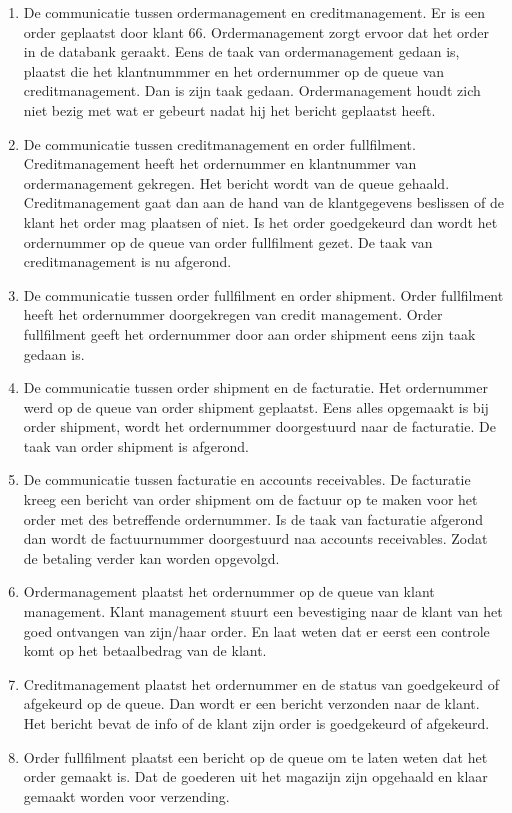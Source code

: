 \begin{enumerate}
	\item De communicatie tussen ordermanagement en creditmanagement. Er is een order geplaatst door klant 66. Ordermanagement zorgt ervoor dat het order in de databank geraakt. Eens de taak van ordermanagement gedaan is, plaatst die het klantnummmer en het ordernummer op de queue van creditmanagement. Dan is zijn taak gedaan. Ordermanagement houdt zich niet bezig met wat er gebeurt nadat hij het bericht geplaatst heeft.
	\item De communicatie tussen creditmanagement en order fullfilment. Creditmanagement heeft het ordernummer en klantnummer van ordermanagement gekregen. Het bericht wordt van de queue gehaald. Creditmanagement gaat dan aan de hand van de klantgegevens beslissen of de klant het order mag plaatsen of niet. Is het order goedgekeurd dan wordt het ordernummer op de queue van order fullfilment gezet. De taak van creditmanagement is nu afgerond.
	\item De communicatie tussen order fullfilment en order shipment. Order fullfilment heeft het ordernummer doorgekregen van credit management. Order fullfilment geeft het ordernummer door aan order shipment eens zijn taak gedaan is. 
	\item De communicatie tussen order shipment en de facturatie. Het ordernummer werd op de queue van order shipment geplaatst. Eens alles opgemaakt is bij order shipment, wordt het ordernummer doorgestuurd naar de facturatie. De taak van order shipment is afgerond.
	\item De communicatie tussen facturatie en accounts receivables. De facturatie kreeg een bericht van order shipment om de factuur op te maken voor het order met des betreffende ordernummer. Is de taak van facturatie afgerond dan wordt de factuurnummer doorgestuurd naa accounts receivables. Zodat de betaling verder kan worden opgevolgd.
	\item Ordermanagement plaatst het ordernummer op de queue van klant management. Klant management stuurt een bevestiging naar de klant van het goed ontvangen van zijn/haar order. En laat weten dat er eerst een controle komt op het betaalbedrag van de klant.
	\item Creditmanagement plaatst het ordernummer en de status van goedgekeurd of afgekeurd op de queue. Dan wordt er een bericht verzonden naar de klant. Het bericht bevat de info of de klant zijn order is goedgekeurd of afgekeurd.
	\item Order fullfilment plaatst een bericht op de queue om te laten weten dat het order gemaakt is. Dat de goederen uit het magazijn zijn opgehaald en klaar gemaakt worden voor verzending.

\end{enumerate}
